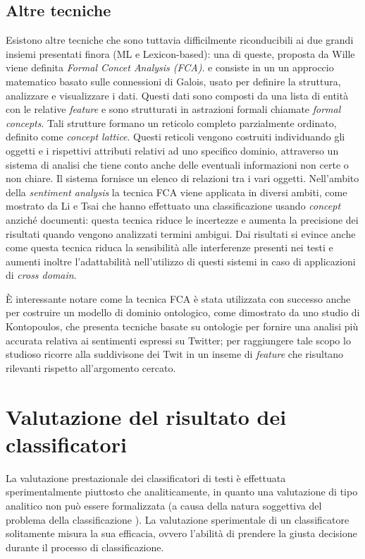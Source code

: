 \documentclass[a4paper,12pt,openright,twoside]{report}
\theoremstyle{definition}
\begin{document}
\subsection{Altre tecniche}
Esistono altre tecniche che sono tuttavia difficilmente riconducibili ai due grandi insiemi presentati finora (ML e Lexicon-based):
una di queste, proposta da Wille %
viene definita \emph{Formal Concet Analysis (FCA)}.
e consiste in un un approccio matematico basato sulle connessioni
di Galois, usato per definire la struttura, analizzare e visualizzare i dati.
Questi dati sono composti da una lista di entità con le relative \emph{feature} e sono strutturati
in astrazioni formali chiamate \emph{formal concepts}. Tali strutture formano un reticolo completo 
parzialmente ordinato, definito come \emph{concept lattice}. Questi reticoli vengono costruiti
individuando gli oggetti e i rispettivi attributi relativi ad uno specifico dominio, attraverso
un sistema di analisi che tiene conto anche delle eventuali informazioni non certe o non chiare.
Il sistema
fornisce un elenco di relazioni tra i vari oggetti.
Nell'ambito della \emph{sentiment analysis} la tecnica FCA viene applicata in diversi ambiti,
come mostrato da Li e Tsai %
che hanno effettuato una classificazione usando \emph{concept} anziché documenti: questa tecnica
riduce le incertezze e aumenta la precisione dei risultati quando vengono analizzati termini ambigui.
Dai risultati si evince anche come questa tecnica riduca la sensibilità alle interferenze presenti nei testi
e aumenti inoltre l'adattabilità nell'utilizzo di questi sistemi in caso di applicazioni di \emph{cross domain}.

\`E interessante notare come la tecnica FCA è stata utilizzata con successo
anche per costruire un modello di dominio ontologico, come dimostrato da uno
studio di Kontopoulos, %
che presenta
tecniche basate su ontologie per fornire una analisi più accurata relativa ai sentimenti espressi
su Twitter; per raggiungere tale scopo lo
studioso ricorre alla suddivisone dei Twit in un inseme di \emph{feature} che risultano rilevanti
rispetto all'argomento cercato.

\section{Valutazione del risultato dei classificatori}
La valutazione prestazionale dei classificatori di testi è effettuata sperimentalmente
piuttosto che analiticamente, in quanto una valutazione di tipo analitico non può essere
formalizzata (a causa della natura soggettiva del problema della classificazione ). La
valutazione sperimentale di un classificatore solitamente misura la sua efficacia, ovvero
l’abilità di prendere la giusta decisione durante il processo di classificazione.
\end{document}
